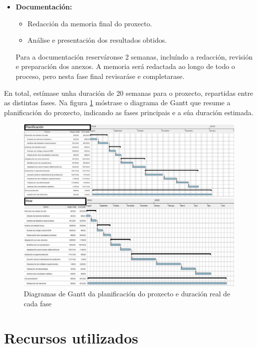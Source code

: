 \begin{itemize}
    \item \textbf{Documentación:}
    \begin{itemize}
        \item Redacción da memoria final do proxecto.
        \item Análise e presentación dos resultados obtidos.
    \end{itemize}
    Para a documentación reserváronse 2 semanas, incluíndo a redacción, revisión e preparación dos anexos. A memoria será redactada ao longo de todo o proceso, pero nesta fase final revisaráse e completarase.
\end{itemize}

En total, estímase unha duración de 20 semanas para o proxecto, repartidas entre as distintas fases.
Na figura \ref{fig:planificacion_proxecto} móstrase o diagrama de Gantt que resume a planificación do proxecto, indicando as fases principais e a súa duración estimada.

\begin{figure}[tbp]
    \centering
    \includegraphics[height=1\textwidth, angle=90]{imaxes/gants-1.png}
    \caption{Diagramas de Gantt da planificación do proxecto e duración real de cada fase}
    \label{fig:planificacion_proxecto}
\end{figure}

\section{Recursos utilizados}
\label{sec:Recursos utilizados}


